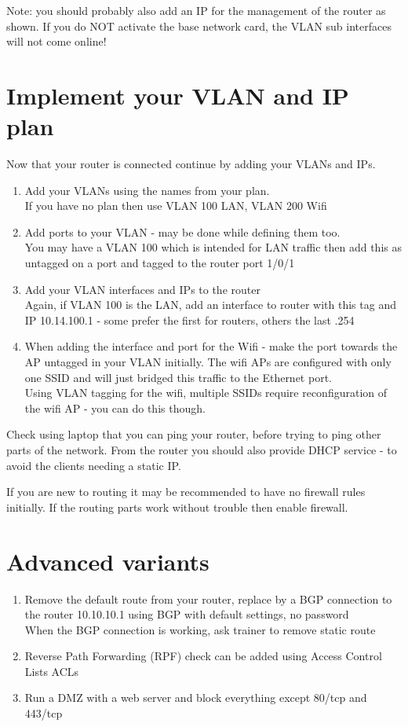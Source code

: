 \documentclass[a4paper,11pt,notitlepage]{report}
\begin{document}
Note: you should probably also add an IP for the management of the router as shown. If you do NOT activate the base network card, the VLAN sub interfaces will not come online!

\section*{Implement your VLAN and IP plan}

Now that your router is connected continue by adding your VLANs and IPs.
\begin{enumerate}
\item Add your VLANs using the names from your plan.\\
If you have no plan then use VLAN 100 LAN, VLAN 200 Wifi
\item Add ports to your VLAN - may be done while defining them too.\\
You may have a VLAN 100 which is intended for LAN traffic then add this as untagged on a port and tagged to the router port 1/0/1
\item Add your VLAN interfaces and IPs to the router\\
Again, if VLAN 100 is the LAN, add an interface to router with this tag and IP 10.14.100.1 - some prefer the first for routers, others the last .254
\item When adding the interface and port for the Wifi - make the port towards the AP untagged in your VLAN initially. The wifi APs are configured with only one SSID and will just bridged this traffic to the Ethernet port.\\
Using VLAN tagging for the wifi, multiple SSIDs require reconfiguration of the wifi AP - you can do this though.
\end{enumerate}

Check using laptop that you can ping your router, before trying to ping other parts of the network. From the router you should also provide DHCP service - to avoid the clients needing a static IP.

If you are new to routing it may be recommended to have no firewall rules initially. If the routing parts work without trouble then enable firewall.

\section*{Advanced variants}
\begin{enumerate}
\item Remove the default route from your router, replace by a BGP connection to the router 10.10.10.1 using BGP with default settings, no password\\
When the BGP connection is working, ask trainer to remove static route
\item Reverse Path Forwarding (RPF) check can be added using Access Control Lists ACLs
\item Run a DMZ with a web server and block everything except 80/tcp and 443/tcp
\end{enumerate}
\end{document}
